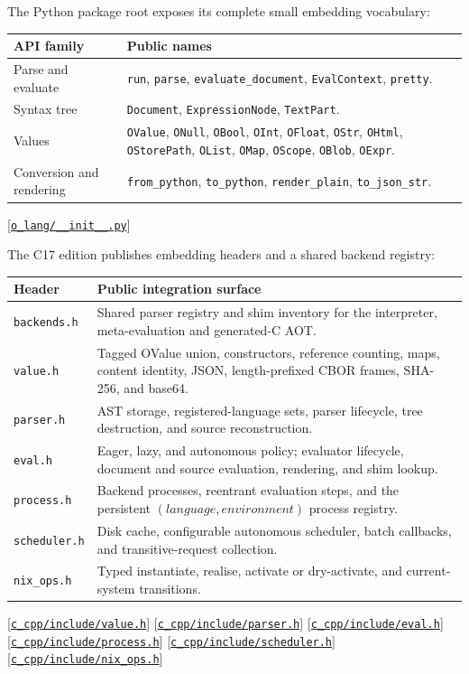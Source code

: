 \documentclass[11pt,oneside]{article}
\newcommand{\src}[1]{\textcolor{OSlate}{\scriptsize[\href{https://github.com/lostadi/OSTADIX/blob/c0b02c326b2329a95ba52447c7180bc93957cd57/#1}{\nolinkurl{#1}}]}\allowbreak}
\begin{document}
The Python package root exposes its complete small embedding vocabulary:

\begin{longtable}{P{0.20\textwidth} P{0.72\textwidth}}
\toprule
\textbf{API family} & \textbf{Public names} \\
\midrule
\endhead
Parse and evaluate & \texttt{run}, \texttt{parse},
\texttt{evaluate\_document}, \texttt{EvalContext}, \texttt{pretty}. \\
Syntax tree & \texttt{Document}, \texttt{ExpressionNode}, \texttt{TextPart}. \\
Values & \texttt{OValue}, \texttt{ONull}, \texttt{OBool}, \texttt{OInt},
\texttt{OFloat}, \texttt{OStr}, \texttt{OHtml}, \texttt{OStorePath},
\texttt{OList}, \texttt{OMap}, \texttt{OScope}, \texttt{OBlob},
\texttt{OExpr}. \\
Conversion and rendering & \texttt{from\_python}, \texttt{to\_python},
\texttt{render\_plain}, \texttt{to\_json\_str}. \\
\bottomrule
\end{longtable}
\src{o_lang/__init__.py}

The C17 edition publishes embedding headers and a shared backend registry:

\begin{longtable}{P{0.17\textwidth} P{0.75\textwidth}}
\toprule
\textbf{Header} & \textbf{Public integration surface} \\
\midrule
\endhead
\texttt{backends.h} & Shared parser registry and shim inventory for the interpreter, meta-evaluation and generated-C AOT. \\
\texttt{value.h} & Tagged OValue union, constructors, reference counting,
maps, content identity, JSON, length-prefixed CBOR frames, SHA-256, and base64. \\
\texttt{parser.h} & AST storage, registered-language sets, parser lifecycle,
tree destruction, and source reconstruction. \\
\texttt{eval.h} & Eager, lazy, and autonomous policy; evaluator lifecycle,
document and source evaluation, rendering, and shim lookup. \\
\texttt{process.h} & Backend processes, reentrant evaluation steps, and the
persistent $(language, environment)$ process registry. \\
\texttt{scheduler.h} & Disk cache, configurable autonomous scheduler, batch
callbacks, and transitive-request collection. \\
\texttt{nix\_ops.h} & Typed instantiate, realise, activate or dry-activate,
and current-system transitions. \\
\bottomrule
\end{longtable}
\src{c_cpp/include/value.h}
\src{c_cpp/include/parser.h}
\src{c_cpp/include/eval.h}
\src{c_cpp/include/process.h}
\src{c_cpp/include/scheduler.h}
\src{c_cpp/include/nix_ops.h}
\end{document}
